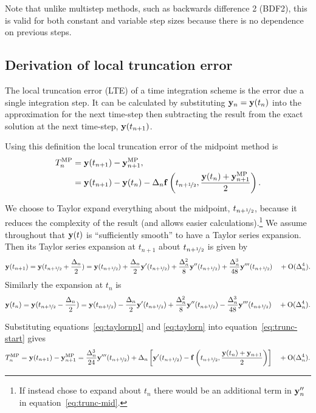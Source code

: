 Note that unlike multistep methods, such as backwards difference 2 (BDF2), this is valid for both constant and variable step sizes because there is no dependence on previous steps.


\subsection{Derivation of local truncation error}
\label{sec:deriv-local-trunc}

The local truncation error (LTE) of a time integration scheme is the error due a single integration step.
It can be calculated by substituting $\mathbf{y}_n = \mathbf{y}(t_n)$ into the approximation for the next time-step then subtracting the result from the exact solution at the next time-step, $\mathbf{y}(t_{n+1})$.

Using this definition the local truncation error of the midpoint method is
\begin{align}
  \lte^\IMP &= \yv(t_{n+1}) - \yv_{n+1}^\IMP, \notag\\
  &= \yv(t_{n+1}) - \yv(t_n) - \dtn \fv\left( \thf, \frac{\yv(t_n) + \yv_{n+1}^\IMP}{2} \right).
  \label{eq:trunc-start}
\end{align}

We choose to Taylor expand everything about the midpoint, $t_{n+\nicefrac{1}{2}}$, because it reduces the complexity of the result (and allows easier calculations).\footnote{If instead chose to expand about $t_n$ there would be an additional term in $\mathbf{y}_n''$ in equation~\eqref{eq:trunc-mid}.}
We assume throughout that $\mathbf{y}(t)$ is ``sufficiently smooth'' to have a Taylor series expansion. Then its Taylor series expansion at $t_{n+1}$ about $t_{n+\nicefrac{1}{2}}$ is given by
\begin{equation}
  \yv(t_{n+1}) = \yv(\thf + \frac{\dtn}{2}) = \yvhf + \frac{\dtn}{2} \yvhf['] + \frac{\dtn^2}{8} \yvhf[''] + \frac{\dtn^3}{48} \yvhf['''] \porder{\dtn^4}.
  \label{eq:taylornp1}
\end{equation}
Similarly the expansion at $t_n$ is
\begin{equation}
  \yv(t_n) = \yv(\thf - \frac{\dtn}{2}) = \yvhf - \frac{\dtn}{2} \yvhf['] + \frac{\dtn^2}{8} \yvhf[''] - \frac{\dtn^3}{48} \yvhf['''] \porder{\dtn^4}.
  \label{eq:taylorn}
\end{equation}

Substituting equations~\eqref{eq:taylornp1} and \eqref{eq:taylorn} into equation~\eqref{eq:trunc-start} gives
\begin{equation}
  \lte^\IMP = \yv(t_{n+1}) - \yv_{n+1}^\IMP
  = \frac{\dtn^3}{24} \yvhf[''']  + \dtn  \left[ \yvhf[']
  - \fv\left( \thf, \frac{\yv(t_n) + \yv_{n+1}}{2} \right) \right]  \porder{\dtn^4}.
  \label{eq:trunc-mid}
\end{equation}

